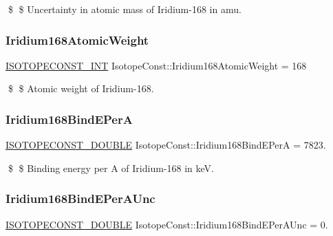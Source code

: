 \$ \$ Uncertainty in atomic mass of Iridium-\/168 in amu. \mbox{\label{group___isotope_const-_iridium-_ir168_gadb24bdf056dd126671855537dd7194d7}} 
\subsubsection{\texorpdfstring{Iridium168\+Atomic\+Weight}{Iridium168AtomicWeight}}
{\footnotesize\ttfamily \mbox{\hyperlink{group___isotope_const-_macros_ga5f18360b3e99483a35c32d789e62621c}{I\+S\+O\+T\+O\+P\+E\+C\+O\+N\+S\+T\+\_\+\+I\+NT}} Isotope\+Const\+::\+Iridium168\+Atomic\+Weight = 168}

\$ \$ Atomic weight of Iridium-\/168. \mbox{\label{group___isotope_const-_iridium-_ir168_ga2ecd59ba74e47a9200d96e4872da40d1}} 
\subsubsection{\texorpdfstring{Iridium168\+Bind\+E\+PerA}{Iridium168BindEPerA}}
{\footnotesize\ttfamily \mbox{\hyperlink{group___isotope_const-_macros_ga8f45a7272ce02c0b4c65c44636ed719a}{I\+S\+O\+T\+O\+P\+E\+C\+O\+N\+S\+T\+\_\+\+D\+O\+U\+B\+LE}} Isotope\+Const\+::\+Iridium168\+Bind\+E\+PerA = 7823.}

\$ \$ Binding energy per A of Iridium-\/168 in keV. \mbox{\label{group___isotope_const-_iridium-_ir168_ga7c6af266ba30afb87240738a7cbf63a5}} 
\subsubsection{\texorpdfstring{Iridium168\+Bind\+E\+Per\+A\+Unc}{Iridium168BindEPerAUnc}}
{\footnotesize\ttfamily \mbox{\hyperlink{group___isotope_const-_macros_ga8f45a7272ce02c0b4c65c44636ed719a}{I\+S\+O\+T\+O\+P\+E\+C\+O\+N\+S\+T\+\_\+\+D\+O\+U\+B\+LE}} Isotope\+Const\+::\+Iridium168\+Bind\+E\+Per\+A\+Unc = 0.}

